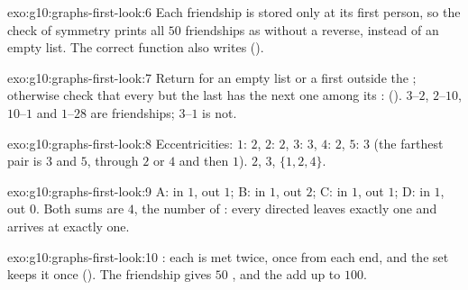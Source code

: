 \begin{solution}{exo:g10:graphs-first-look:6}
Each friendship is stored only at its first person, so the check of symmetry prints all $50$ friendships as 
without a reverse, instead of an empty list. The correct function also writes 
().
\end{solution}

\begin{solution}{exo:g10:graphs-first-look:7}
Return  for an empty list or a first  outside the ; otherwise check that every  but the
last has the next one among its : 
(). $3$--$2$, $2$--$10$, $10$--$1$ and $1$--$28$ are friendships; $3$--$1$ is not.
\end{solution}

\begin{solution}{exo:g10:graphs-first-look:8}
Eccentricities: $1$: $2$, $2$: $2$, $3$: $3$, $4$: $2$, $5$: $3$ (the farthest pair is $3$ and $5$, through $2$ or
$4$ and then $1$).  $2$,  $3$,  $\{1, 2, 4\}$.
\end{solution}

\begin{solution}{exo:g10:graphs-first-look:9}
A: in $1$, out $1$; B: in $1$, out $2$; C: in $1$, out $1$; D: in $1$, out $0$. Both sums are $4$, the number of
: every directed  leaves exactly one  and arrives at exactly one.
\end{solution}

\begin{solution}{exo:g10:graphs-first-look:10}
: each  is met twice, once from each end, and the
set keeps it once (). The friendship  gives $50$ , and the  add up to
$100$.
\end{solution}


